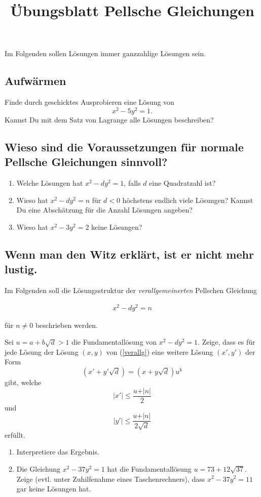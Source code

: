\documentclass[a4paper,12pt]{article}
\title{Übungsblatt Pellsche Gleichungen}
\newcounter{task}
\newcommand{\task}{\stepcounter{task}\subsection}
\begin{document}
\date{}
\maketitle
Im Folgenden sollen Lösungen immer ganzzahlige Lösungen sein.
\task{Aufwärmen}

Finde durch geschicktes Ausprobieren eine Lösung von \[x^2-5y^2=1\text{.}\] Kannst Du mit dem Satz von Lagrange alle Lösungen beschreiben?

\task{Wieso sind die Voraussetzungen für normale Pellsche Gleichungen sinnvoll?}

\begin{enumerate}
    \item Welche Lösungen hat $x^2-dy^2=1$, falls $d$ eine Quadratzahl ist?
    \item Wieso hat $x^2-dy^2=n$ für $d<0$ höchstens endlich viele Lösungen? Kannst Du eine Abschätzung für die Anzahl Lösungen angeben?
    \item Wieso hat $x^2-3y^2=2$ keine Lösungen?
\end{enumerate}

\task{Wenn man den Witz erklärt, ist er nicht mehr lustig.}
Im Folgenden soll die Lösungsstruktur der \emph{verallgemeinerten} Pellschen Gleichung

\begin{align}\label{verallg}
x^2-dy^2=n    
\end{align}

für $n\neq 0$ beschrieben werden.

Sei $u=a+b\sqrt d>1$ die Fundamentallösung von $x^2-dy^2=1$. Zeige, dass es für jede Lösung der Lösung $(x,y)$ von (\ref{verallg}) eine weitere Lösung $(x',y')$ der Form \[
(x'+y'\sqrt{d})=(x+y\sqrt{d})u^k
\] gibt, welche \[\vert x'\vert\leq\frac{u+\vert n\vert}{2}\] und \[\vert y'\vert\leq\frac{u+\vert n\vert}{2\sqrt{d}}\] erfüllt.

\begin{enumerate}
    \item Interpretiere das Ergebnis.
    \item Die Gleichung $x^2-37y^2=1$ hat die Fundamentallösung $u=73+12\sqrt{37}$. Zeige (evtl. unter Zuhilfenahme eines Taschenrechners), dass $x^2-37y^2=11$ gar keine Lösungen hat.
\end{enumerate}
\end{document}
